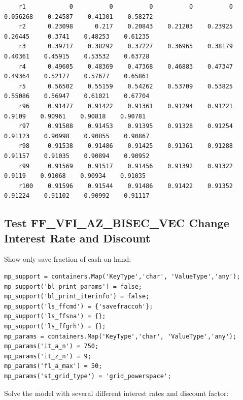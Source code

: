 \documentclass[
]{book}
\begin{document}
\begin{verbatim}
    r1            0          0          0          0          0    0.056268    0.24587    0.41301    0.58272
    r2      0.23098      0.217    0.20843    0.21203    0.23925     0.26445     0.3741    0.48253    0.61235
    r3      0.39717    0.38292    0.37227    0.36965    0.38179     0.40361    0.45915    0.53532    0.63728
    r4      0.49605    0.48369    0.47368    0.46883    0.47347     0.49364    0.52177    0.57677    0.65861
    r5      0.56502    0.55159    0.54262    0.53709    0.53825     0.55086    0.56947    0.61021    0.67704
    r96     0.91477    0.91422    0.91361    0.91294    0.91221      0.9109    0.90961    0.90818    0.90781
    r97     0.91508    0.91453    0.91395    0.91328    0.91254     0.91123    0.90998    0.90855    0.90867
    r98     0.91538    0.91486    0.91425    0.91361    0.91288     0.91157    0.91035    0.90894    0.90952
    r99     0.91569    0.91517    0.91456    0.91392    0.91322      0.9119    0.91068    0.90934    0.91035
    r100    0.91596    0.91544    0.91486    0.91422    0.91352     0.91224    0.91102    0.90992    0.91117
\end{verbatim}

\hypertarget{test-ff_vfi_az_bisec_vec-change-interest-rate-and-discount}{%
\subsection{Test FF\_VFI\_AZ\_BISEC\_VEC Change Interest Rate and Discount}\label{test-ff_vfi_az_bisec_vec-change-interest-rate-and-discount}}

Show only save fraction of cash on hand:

\begin{verbatim}
mp_support = containers.Map('KeyType','char', 'ValueType','any');
mp_support('bl_print_params') = false;
mp_support('bl_print_iterinfo') = false;
mp_support('ls_ffcmd') = {'savefraccoh'};
mp_support('ls_ffsna') = {};
mp_support('ls_ffgrh') = {};
mp_params = containers.Map('KeyType','char', 'ValueType','any');
mp_params('it_a_n') = 750;
mp_params('it_z_n') = 9;
mp_params('fl_a_max') = 50;
mp_params('st_grid_type') = 'grid_powerspace';
\end{verbatim}

Solve the model with several different interest rates and discount
factor:
\end{document}
